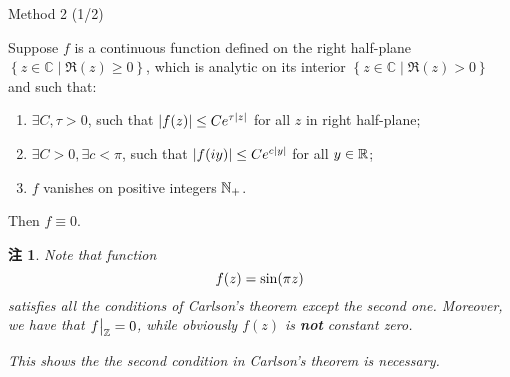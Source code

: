 \documentclass[pdf,notes]{beamer}
\newtheorem{remark}{注}
\begin{document}
\begin{frame}{Method 2 (1/2)}
			\vspace{-0.2cm}
	\begin{fact}
		Suppose $f$ is a continuous function defined on the right half-plane $\left\{ z\in\mathbb{C}\mid \Re(z)\ge0 \right\}$, which
		is analytic on its interior $\left\{ z\in\mathbb{C}\mid\Re(z)>0 \right\}$ and such that:\begin{enumerate}
			\item $\exists C,\tau>0$, such that $\left|f(z)\right|\le C e^{\tau\left|z\right|}$ for all $z$ in right half-plane;
			\item $\exists C>0,\exists c<\pi$, such that $\left|f(iy)\right|\le Ce^{c\left|y\right|}$ for all $y\in\mathbb{R}$;
			\item $f$ vanishes on positive integers $\mathbb{N}_+$.
		\end{enumerate}
		Then $f\equiv0$.
	\end{fact}
			\vspace{-0.2cm}
	\begin{remark}
		Note that function \begin{equation*}
			\vspace{-0.2cm}
			f(z)=\sin(\pi z)
		\end{equation*}
		satisfies all the conditions of Carlson's theorem except the second one. Moreover, we have that $f\big|_{\mathbb{Z}}=0$, while obviously $f(z)$ is {\bf not} constant zero.

		This shows the the second condition in Carlson's theorem is necessary.
	\end{remark}
\end{frame}
\end{document}
